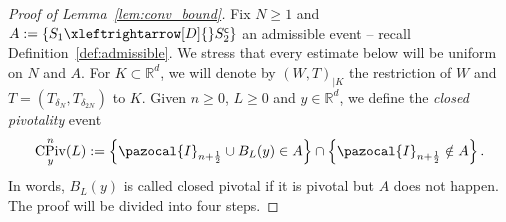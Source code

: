 \documentclass[AHL,Unicode,longabstracts,published]{cedram}
\DeclareMathOperator{\CPiv}{CPiv}
\newcommand{\R}{\mathbb{R}}
\newcommand{\sfc}{\mathsf{c}}
\newcommand{\lr}[4]{#3\xleftrightarrow[#1]{#2} #4}
\newcommand{\R}{\mathbb{R}}
\begin{document}
\begin{proof}[Proof of Lemma~\ref{lem:conv_bound}]
Fix $N\geq1$ and {\small$A:=\{\lr{D}{}{S_1}{S_2^{\sfc}}\}$} an admissible event -- recall Definition~\ref{def:admissible}. We stress that every estimate below will be uniform on $N$ and $A$. For $K\subset \R^d$, we will denote by $(W,T)_{|K}$ the restriction of $W$ and $T=(T_{\delta_N},T_{\delta_{2N}})$ to $K$. Given $n\geq0$, $L \geq 0$ and $y\in\R^d$, we define the \emph{closed pivotality} event
\begin{equation}\label{eq:cpiv_def}
\CPiv^n_y(L):=\left\{\pazocal{I}_{n+\frac12}\cup B_{L}(y) \in A\right\}\cap \left\{\pazocal{I}_{n+\frac12} \notin A\right\}.
\end{equation}
In words, $B_L(y)$ is called closed pivotal if it is pivotal but $A$ does not happen. The proof will be divided into four steps.


\end{proof}
\end{document}
